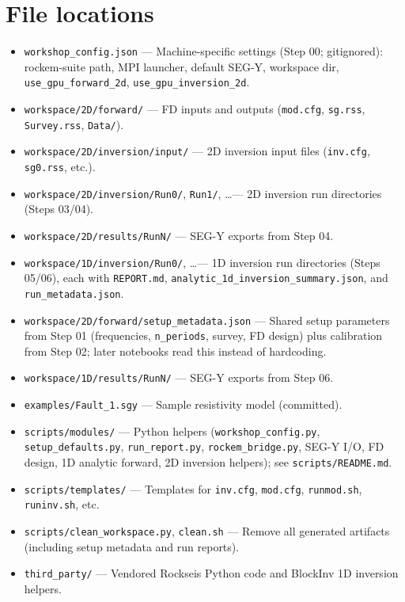 \documentclass[11pt,a4paper]{article}
\begin{document}
\section{File locations}

\begin{itemize}
  \item \texttt{workshop\_config.json} — Machine-specific settings (Step 00; gitignored): rockem-suite path, MPI launcher, default SEG-Y, workspace dir, \texttt{use\_gpu\_forward\_2d}, \texttt{use\_gpu\_inversion\_2d}.
  \item \texttt{workspace/2D/forward/} — FD inputs and outputs (\texttt{mod.cfg}, \texttt{sg.rss}, \texttt{Survey.rss}, \texttt{Data/}).
  \item \texttt{workspace/2D/inversion/input/} — 2D inversion input files (\texttt{inv.cfg}, \texttt{sg0.rss}, etc.).
  \item \texttt{workspace/2D/inversion/Run0/}, \texttt{Run1/}, \ldots — 2D inversion run directories (Steps 03/04).
  \item \texttt{workspace/2D/results/RunN/} — SEG-Y exports from Step 04.
  \item \texttt{workspace/1D/inversion/Run0/}, \ldots — 1D inversion run directories (Steps 05/06), each with \texttt{REPORT.md}, \texttt{analytic\_1d\_inversion\_summary.json}, and \texttt{run\_metadata.json}.
  \item \texttt{workspace/2D/forward/setup\_metadata.json} — Shared setup parameters from Step 01 (frequencies, \texttt{n\_periods}, survey, FD design) plus calibration from Step 02; later notebooks read this instead of hardcoding.
  \item \texttt{workspace/1D/results/RunN/} — SEG-Y exports from Step 06.
  \item \texttt{examples/Fault\_1.sgy} — Sample resistivity model (committed).
  \item \texttt{scripts/modules/} — Python helpers (\texttt{workshop\_config.py}, \texttt{setup\_defaults.py}, \texttt{run\_report.py}, \texttt{rockem\_bridge.py}, SEG-Y I/O, FD design, 1D analytic forward, 2D inversion helpers); see \texttt{scripts/README.md}.
  \item \texttt{scripts/templates/} — Templates for \texttt{inv.cfg}, \texttt{mod.cfg}, \texttt{runmod.sh}, \texttt{runinv.sh}, etc.
  \item \texttt{scripts/clean\_workspace.py}, \texttt{clean.sh} — Remove all generated artifacts (including setup metadata and run reports).
  \item \texttt{third\_party/} — Vendored Rockseis Python code and BlockInv 1D inversion helpers.
\end{itemize}
\end{document}
